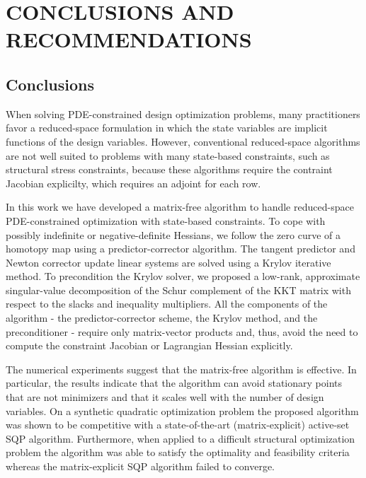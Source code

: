  
\chapter{CONCLUSIONS AND RECOMMENDATIONS}

\section{Conclusions}
When solving PDE-constrained design optimization problems, many practitioners
favor a reduced-space formulation in which the state variables are implicit
functions of the design variables.  However, conventional reduced-space
algorithms are not well suited to problems with many state-based constraints, 
such as structural stress constraints, 
because these algorithms require the contraint Jacobian explicilty, which
requires an adjoint for each row.

In this work we have developed a matrix-free algorithm to handle reduced-space
PDE-constrained optimization with state-based constraints.  To cope with
possibly indefinite or negative-definite Hessians, we follow the zero curve of a homotopy map using a
predictor-corrector algorithm.  The tangent predictor and Newton corrector update linear systems are
solved using a Krylov iterative method.  To precondition the Krylov solver, we
proposed a low-rank, approximate singular-value decomposition of the Schur
complement of the KKT matrix with respect to the slacks and inequality multipliers.  All
the components of the algorithm - the predictor-corrector scheme, the Krylov
method, and the preconditioner - require only matrix-vector products and,
thus, avoid the need to compute the constraint Jacobian or Lagrangian Hessian
explicitly.

The numerical experiments suggest that the matrix-free algorithm is effective.
In particular, the results indicate that the algorithm can avoid stationary
points that are not minimizers and that it scales well with the number of design
variables.  On a synthetic quadratic optimization problem the proposed algorithm
was shown to be competitive with a state-of-the-art (matrix-explicit) active-set
SQP algorithm.  Furthermore, when applied to a difficult structural optimization
problem the algorithm was able to satisfy the optimality and feasibility
criteria whereas the matrix-explicit SQP algorithm failed to converge. 

